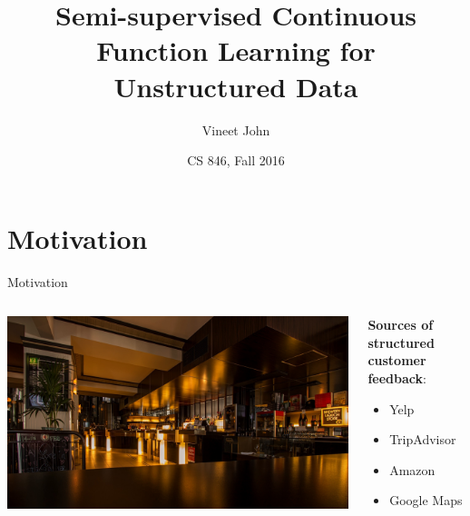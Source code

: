 \documentclass[aspectratio=169]{beamer}
\title{Semi-supervised Continuous Function Learning for Unstructured Data}
\date{CS 846, Fall 2016}
\author{Vineet John}
\begin{document}
\maketitle


\section{Motivation}

\begin{frame}{Motivation}

	\begin{columns}[T] %
		\begin{column}{.45\textwidth}
			\includegraphics[width=.9\textwidth]{images/restaurant.jpg}
		\end{column}
		\hfill
		\begin{column}{.45\textwidth}
			\textbf{Sources of structured customer feedback}:
			\begin{itemize}
				\item Yelp
				\item TripAdvisor
				\item Amazon
				\item Google Maps
			\end{itemize}
		\end{column}
	\end{columns}
\end{frame}
\end{document}
